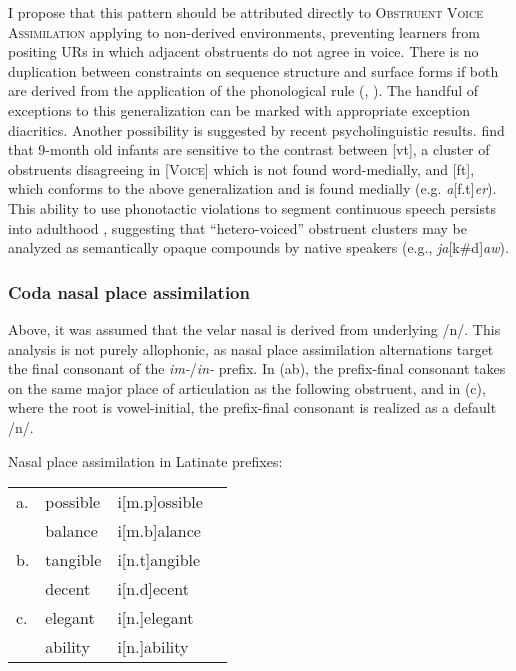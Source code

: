 I propose that this pattern should be attributed directly to \textsc{Obstruent Voice Assimilation} applying to non-derived environments, preventing learners from positing URs in which adjacent obstruents do not agree in voice. There is no duplication between constraints on sequence structure and surface forms if both are derived from the application of the phonological rule (\citealt[][401f.]{Stanley1967}, \citealt[][382]{SPE}). The handful of exceptions to this generalization can be marked with appropriate exception diacritics. Another possibility is suggested by recent psycholinguistic results. \citet{Mattys2001b} find that 9-month old infants are sensitive to the contrast between [vt], a cluster of obstruents disagreeing in [\textsc{Voice}] which is not found word-medially, and [ft], which conforms to the above generalization and is found medially (e.g. \emph{a}[f.t]\emph{er}). This ability to use phonotactic violations to segment continuous speech persists into adulthood \citep{McQueen1998}, suggesting that ``hetero-voiced'' obstruent clusters may be analyzed as semantically opaque compounds by native speakers (e.g., \emph{ja}[k\#d]\emph{aw}). 

\subsubsection{Coda nasal place assimilation}
\label{cnpasection}

Above, it was assumed that the velar nasal is derived from underlying /n/. 
This analysis is not purely allophonic, as nasal place assimilation alternations target the final consonant of the \emph{im-}/\emph{in-} prefix. In (\lastx ab), the prefix-final consonant takes on the same major place of articulation as the following obstruent, and in (\lastx c), where the root is vowel-initial, the prefix-final consonant is realized as a default /n/.

\ex Nasal place assimilation in Latinate prefixes: \\
\begin{tabular}{l l l l}
a. & possible & i[m.p]ossible \\
   & balance  & i[m.b]alance  \\
b. & tangible & i[n.t]angible \\
   & decent   & i[n.d]ecent   \\
c. & elegant  & i[n.]elegant  \\
   & ability  & i[n.]ability  \\
\end{tabular} 
\xe

